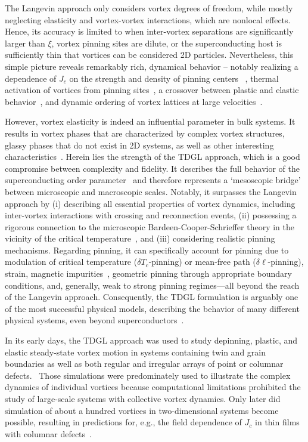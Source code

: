 \documentclass[%
 aip,
 amsmath,amssymb,
 reprint,%
floatfix]{revtex4-1}
\newcommand{\Tc}{T_{c}}
\newcommand{\Jc}{J_{c}}
\begin{document}
The Langevin approach only considers vortex degrees of freedom, while mostly neglecting elasticity and vortex-vortex interactions, which are nonlocal effects. Hence, its accuracy is limited to when inter-vortex separations are significantly larger than $\xi$, vortex pinning sites are dilute, or the superconducting host is sufficiently thin that vortices can be considered 2D particles. Nevertheless, this simple picture reveals remarkably rich, dynamical behavior -- notably realizing a dependence of $\Jc$ on the strength and density of pinning centers ~\cite{BrandtJLTP83-1,BrandtJLTP83-2}, thermal activation of vortices from pinning sites~\cite{KoshelevPhysC92}, a crossover between plastic and elastic behavior~\cite{CaoPhysRevB00,DiScalaNJP12}, and dynamic ordering of vortex lattices at large velocities~\cite{KoshelevPhysRevLett94, MoonPhysRevLett96}.  

However, vortex elasticity is indeed an influential parameter in bulk systems. It results in vortex phases that are characterized by complex vortex structures, glassy phases that do not exist in 2D systems, as well as other interesting characteristics~\cite{ErtasK:1996, OtterloPRL00, BustingorryCD:2007, LuoHu:2007, LuoHuJSNM10, Koshelev:2011, DobramyslEPJ13}. Herein lies the strength of the TDGL approach, which is a good compromise between complexity and fidelity. It describes the full behavior of the superconducting order parameter~\cite{schmid} and therefore represents a `mesoscopic bridge' between microscopic and macroscopic scales. Notably, it surpasses the Langevin approach by (i) describing all essential properties of vortex dynamics, including inter-vortex interactions with crossing and reconnection events, (ii) possessing a rigorous connection to the microscopic Bardeen-Cooper-Schrieffer theory in the vicinity of the critical temperature~\cite{Gorkov:1959}, and (iii) considering realistic pinning mechanisms. Regarding pinning, it can specifically account for pinning due to modulation of critical temperature ($\delta \Tc$-pinning) or mean-free path ($\delta \ell$-pinning), strain, magnetic impurities~\cite{DoriaEPL07}, geometric pinning through appropriate boundary conditions, and, generally, weak to strong pinning regimes---all beyond the reach of the Langevin approach. Consequently, the TDGL formulation is arguably one of the most successful physical models, describing the behavior of many different physical systems, even beyond superconductors~\cite{Aranson:2002}.


In its early days, the TDGL approach was used to study depinning, plastic, and elastic steady-state vortex motion in systems containing twin and grain boundaries as well as both regular and irregular arrays of point or columnar defects.~\cite{kaper,crabtree2000} Those simulations were predominately used to illustrate the complex dynamics of individual vortices because computational limitations prohibited the study of large-scale systems with collective vortex dynamics. Only later did simulation of about a hundred vortices in two-dimensional systems become possible, resulting in predictions for, e.g., the field dependence of $\Jc$ in thin films with columnar defects~\cite{Palonen2012}.
\end{document}
